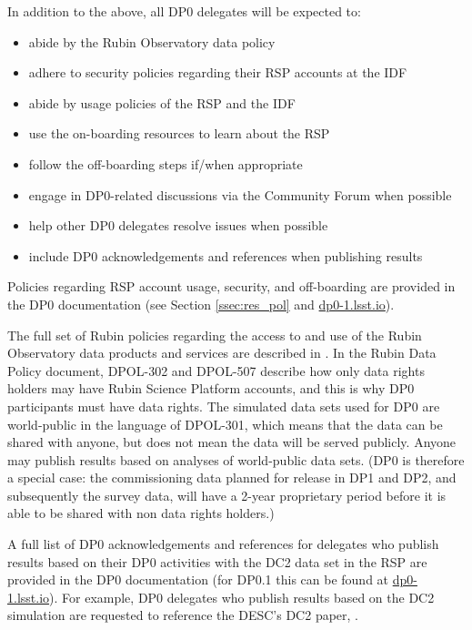\documentclass[DM,lsstdraft,authoryear,toc]{lsstdoc}
\begin{document}
In addition to the above, all DP0 delegates will be expected to:
\begin{itemize}
\item abide by the Rubin Observatory data policy 
\item adhere to security policies regarding their RSP accounts at the IDF
\item abide by usage policies of the RSP and the IDF
\item use the on-boarding resources to learn about the RSP
\item follow the off-boarding steps if/when appropriate
\item engage in DP0-related discussions via the Community Forum when possible
\item help other DP0 delegates resolve issues when possible
\item include DP0 acknowledgements and references when publishing results
\end{itemize}

Policies regarding RSP account usage, security, and off-boarding are provided in the DP0 documentation (see Section \ref{ssec:res_pol} and \url{dp0-1.lsst.io}).

The full set of Rubin policies regarding the access to and use of the Rubin Observatory data products and services are described in .
In the Rubin Data Policy document, DPOL-302 and DPOL-507 describe how only data rights holders may have Rubin Science Platform accounts, and this is why DP0 participants must have data rights.
The simulated data sets used for DP0 are world-public in the language of DPOL-301, which means that the data can be shared with anyone, but does not mean the data will be served publicly.
Anyone may publish results based on analyses of world-public data sets.
(DP0 is therefore a special case: the commissioning data planned for release in DP1 and DP2, and subsequently the survey data, will have a 2-year proprietary period before it is able to be shared with non data rights holders.)

A full list of DP0 acknowledgements and references for delegates who publish results based on their DP0 activities with the DC2 data set in the RSP are provided in the DP0 documentation (for DP0.1 this can be found at \url{dp0-1.lsst.io}). 
For example, DP0 delegates who publish results based on the DC2 simulation are requested to reference the DESC's DC2 paper, \citet{2020arXiv201005926L}.
\end{document}
